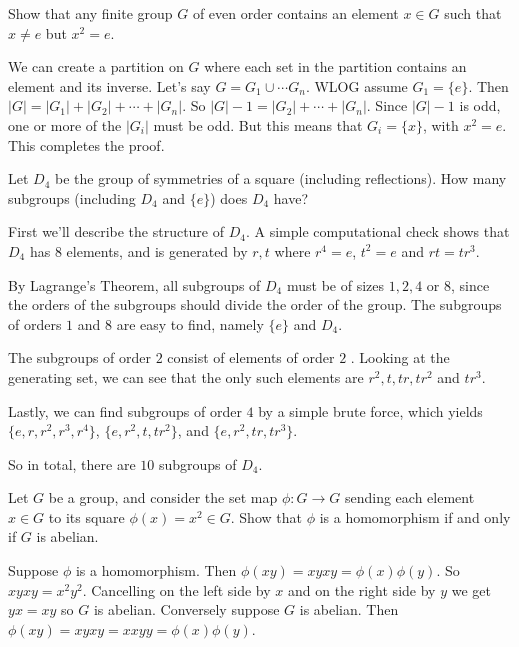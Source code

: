 \documentclass[11pt,letterpaper]{article}
\begin{document}
\pagebreak
\begin{problem}
  Show that any finite group $G$ of even order contains an element $x\in G$ such that $x\neq e$ but $x^2=e$.
\end{problem}

We can create a partition on $G$ where each set in the partition contains an element and its inverse. Let's say $G=G_1\cup\cdots G_n$. WLOG assume $G_1=\{e\}$. Then $|G|=|G_1|+|G_2|+\cdots+|G_n|$. So $|G|-1=|G_2|+\cdots+|G_n|$. Since $|G|-1$ is odd, one or more of the $|G_i|$ must be odd. But this means that $G_i=\{x\}$, with $x^2=e$. This completes the proof.       

\pagebreak
\begin{problem}
  Let $D_4$ be the group of symmetries of a square (including
  reflections). How many subgroups (including $D_4$ and $\{e\}$) does $D_4$ have?
\end{problem}

First we'll describe the structure of $D_4$. A simple computational check shows that $D_4$ has $8$ elements, and is generated by $r, t$ where $r^4=e$, $t^2=e$ and $rt=tr^3$.

By Lagrange's Theorem, all subgroups of $D_4$ must be of sizes $1,2,4$ or $8$, since the orders of the subgroups should divide the order of the group. The subgroups of orders $1$ and $8$ are easy to find, namely $\{e\}$ and $D_4$.

The subgroups of order $2$ consist of elements of order $2$ . Looking at the generating set, we can see that the only such elements are $r^2, t, tr, tr^2$ and $tr^3$.

Lastly, we can find subgroups of order $4$ by a simple brute force, which yields $\{e,r,r^2,r^3,r^4\}$, $\{e, r^2, t, tr^2\}$, and $\{e, r^2, tr, tr^3\}$.

So in total, there are $10$ subgroups of $D_4$.



\pagebreak
\begin{problem}
  Let $G$ be a group, and consider the set map $\phi:G\to G$ sending each element $x\in G$ to its square $\phi(x)=x^2\in G$. Show that $\phi$ is a homomorphism if and only if $G$ is abelian.
\end{problem}

Suppose $\phi$ is a homomorphism. Then $\phi(xy)=xyxy=\phi(x)\phi(y)$. So $xyxy=x^2y^2$. Cancelling on the left side by $x$ and on the right side by $y$ we get $yx=xy$ so $G$ is abelian. Conversely suppose $G$ is abelian. Then $\phi(xy) = xyxy=xxyy=\phi(x)\phi(y)$.   
\end{document}
